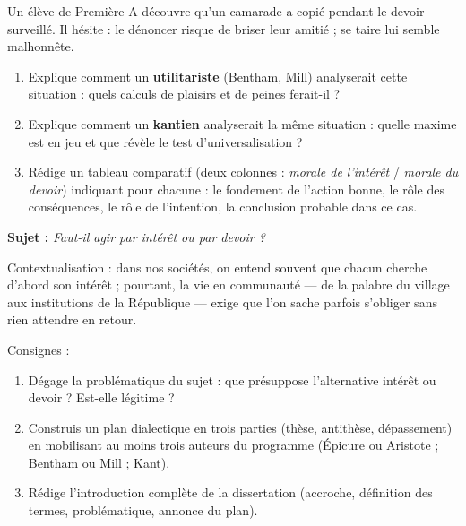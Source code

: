 \documentclass[11pt]{article}
\newcounter{popsec}
\newcounter{popsub}
\newcommand{\courssub}[1]{%
  \stepcounter{popsub}%
  \par\vspace{9pt}\noindent{\popxbold\fontsize{11.5}{13}\selectfont\color{popink}{\color{poporange}\thepopsec.\thepopsub}\hspace{6pt}#1}\par\nopagebreak\vspace{4pt}
}
\begin{document}
\begin{exercice}
Un élève de Première A découvre qu'un camarade a copié pendant le devoir surveillé. Il hésite : le dénoncer risque de briser leur amitié ; se taire lui semble malhonnête.

\begin{enumerate}
\item Explique comment un \textbf{utilitariste} (Bentham, Mill) analyserait cette situation : quels calculs de plaisirs et de peines ferait-il ?
\item Explique comment un \textbf{kantien} analyserait la même situation : quelle maxime est en jeu et que révèle le test d'universalisation ?
\item Rédige un tableau comparatif (deux colonnes : \emph{morale de l'intérêt} / \emph{morale du devoir}) indiquant pour chacune : le fondement de l'action bonne, le rôle des conséquences, le rôle de l'intention, la conclusion probable dans ce cas.
\end{enumerate}
\end{exercice}

\courssub{Je me prépare au Bac}

\begin{exercice}
\textbf{Sujet :} \emph{Faut-il agir par intérêt ou par devoir ?}

Contextualisation : dans nos sociétés, on entend souvent que \guillemotleft chacun cherche d'abord son intérêt \guillemotright ; pourtant, la vie en communauté — de la palabre du village aux institutions de la République — exige que l'on sache parfois s'obliger sans rien attendre en retour.

Consignes :
\begin{enumerate}
\item Dégage la problématique du sujet : que présuppose l'alternative \guillemotleft intérêt ou devoir \guillemotright ? Est-elle légitime ?
\item Construis un plan dialectique en trois parties (thèse, antithèse, dépassement) en mobilisant au moins trois auteurs du programme (Épicure ou Aristote ; Bentham ou Mill ; Kant).
\item Rédige l'introduction complète de la dissertation (accroche, définition des termes, problématique, annonce du plan).
\end{enumerate}
\end{exercice}
\end{document}
